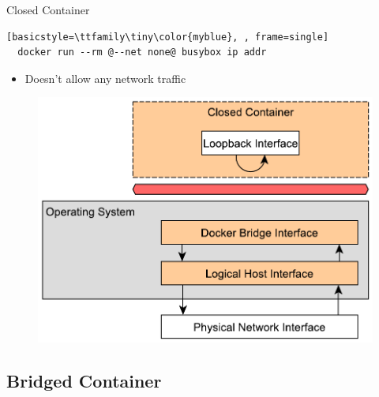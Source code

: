 \begin{frame}[fragile]{Closed Container}
  \begin{lstlisting}[basicstyle=\ttfamily\tiny\color{myblue}, , frame=single]
  docker run --rm @--net none@ busybox ip addr
  \end{lstlisting}
  \begin{itemize}
    \item Doesn't allow any network traffic
  \end{itemize}  
  \begin{figure}
    \includegraphics[scale=0.5]{figures/net-closed-container.pdf}
  \end{figure}
\end{frame}

\subsection{Bridged Container}

